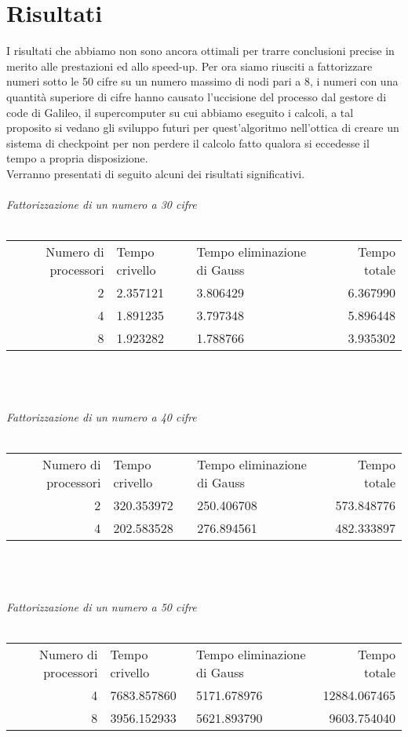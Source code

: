 \section{Risultati}
\label{sec:risultati}


I risultati che abbiamo non sono ancora ottimali per trarre conclusioni precise in merito alle prestazioni ed allo speed-up.
Per ora siamo riusciti a fattorizzare numeri sotto le 50 cifre su un numero massimo di nodi pari a 8, i numeri con una quantità superiore di cifre hanno causato l'uccisione del processo dal gestore di code di Galileo, il supercomputer su cui abbiamo eseguito i calcoli, a tal proposito si vedano gli sviluppo futuri per quest'algoritmo nell'ottica di creare un sistema di checkpoint per non perdere il calcolo fatto qualora si eccedesse il tempo a propria disposizione. \\
Verranno presentati di seguito alcuni dei risultati significativi.\\ \\

\emph{Fattorizzazione di un numero a 30 cifre} \\ \\
\begin{tabular}{|r|ll|r|} 
Numero di processori & Tempo crivello & Tempo eliminazione di Gauss & Tempo totale \\
2 & 2.357121 & 3.806429 & 6.367990 \\
4 & 1.891235 & 3.797348 & 5.896448 \\
8 & 1.923282 & 1.788766 & 3.935302
\end{tabular}
\\ \\ \\

\emph{Fattorizzazione di un numero a 40 cifre} \\ \\
\begin{tabular}{|r|ll|r|} 
Numero di processori & Tempo crivello & Tempo eliminazione di Gauss & Tempo totale \\
2 & 320.353972 & 250.406708 & 573.848776 \\
4 & 202.583528 & 276.894561 & 482.333897
\end{tabular}
\\ \\ \\

\emph{Fattorizzazione di un numero a 50 cifre} \\ \\
\begin{tabular}{|r|ll|r|} 
Numero di processori & Tempo crivello & Tempo eliminazione di Gauss & Tempo totale \\
4 & 7683.857860 & 5171.678976 & 12884.067465 \\
8 & 3956.152933 & 5621.893790 & 9603.754040
\end{tabular}
\\ \\ \\

